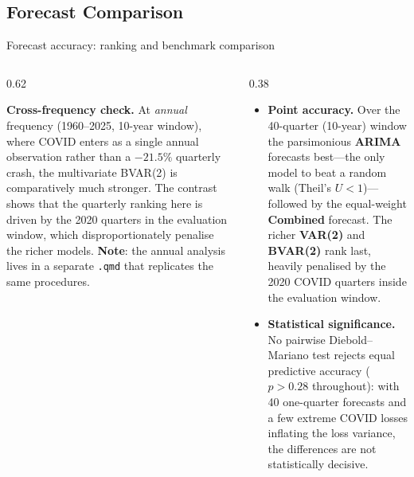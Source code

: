 \documentclass[9pt]{beamer}
\begin{document}
\subsection{Forecast Comparison}
\begin{frame}{Forecast accuracy: ranking and benchmark comparison}\label{slide:forecast-comp}

\small

\begin{columns}
  \begin{column}{0.62\textwidth}
\vspace{-0.2cm}
    {\fontsize{5}{5.5}\selectfont
    \setlength{\tabcolsep}{1.2pt}
    \setlength{\abovecaptionskip}{1pt}
    \setlength{\belowcaptionskip}{1pt}
    
    \vspace{0.1cm}
    
    }

    \vspace{0.5cm}
    \scriptsize \textbf{Cross-frequency check.} At \emph{annual} frequency (1960--2025, 10-year window), where COVID enters as a single annual observation rather than a $-21.5\%$ quarterly crash, the multivariate BVAR(2) is comparatively much stronger. The contrast shows that the quarterly ranking here is driven by the 2020 quarters in the evaluation window, which disproportionately penalise the richer models. \textbf{Note}: the annual analysis lives in a separate \texttt{.qmd} that replicates the same procedures.
  \end{column}

  \begin{column}{0.38\textwidth}
    \tiny
    \begin{itemize}\setlength{\itemsep}{0pt}\setlength{\parskip}{0pt}
      \item \textbf{Point accuracy.} Over the 40-quarter (10-year) window the parsimonious \textbf{ARIMA} forecasts best---the only model to beat a random walk (Theil's $U<1$)---followed by the equal-weight \textbf{Combined} forecast. The richer \textbf{VAR(2)} and \textbf{BVAR(2)} rank last, heavily penalised by the 2020 COVID quarters inside the evaluation window.

      \item \textbf{Statistical significance.} No pairwise Diebold--Mariano test rejects equal predictive accuracy ($p>0.28$ throughout): with 40 one-quarter forecasts and a few extreme COVID losses inflating the loss variance, the differences are not statistically decisive.


\end{itemize}
\end{column}
\end{columns}
\end{frame}
\end{document}

